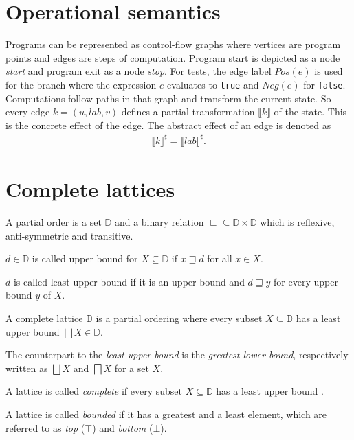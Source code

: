 \section{Operational semantics}
Programs can be represented as control-flow graphs where vertices are program points and edges are steps of computation. Program start is depicted as a node \textit{start} and program exit as a node \textit{stop}.
For tests, the edge label $Pos(e)$ is used for the branch where the expression $e$ evaluates to \verb|true| and $Neg(e)$ for \verb|false|.
Computations follow paths in that graph and transform the current state.
So every edge $k = (u, lab, v)$ defines a partial transformation $\llbracket k \rrbracket$ of the state. This is the concrete effect of the edge.
The abstract effect of an edge is denoted as
\begin{align}
\llbracket k \rrbracket^\sharp = \llbracket lab \rrbracket^\sharp.
\end{align}

\section{Complete lattices}
\begin{definition}A partial order is a set $\mathbb{D}$ and a binary relation $\sqsubseteq \subseteq \mathbb{D} \times \mathbb{D}$ which is reflexive, anti-symmetric and transitive.
\end{definition}
\begin{definition}
$d \in \mathbb{D}$ is called upper bound for $X \subseteq \mathbb{D}$ if $x \sqsupseteq d$ for all $x \in X$.

$d$ is called least upper bound if it is an upper bound and $d \sqsupseteq y$ for every upper bound $y$ of $X$.
\end{definition}
\begin{definition}
A complete lattice $\mathbb{D}$ is a partial ordering where every subset $X \subseteq \mathbb{D}$ has a least upper bound $\bigsqcup X \in \mathbb{D}$.
\end{definition}
The counterpart to the \textit{least upper bound} is the \textit{greatest lower bound}, respectively written as $\bigsqcup X$ and $\bigsqcap X$ for a set $X$.

A lattice is called \textit{complete} if every subset $X \subseteq \mathbb{D}$ has a least upper bound \cite{seidl2009uebersetzerbau}.

A lattice is called \textit{bounded} if it has a greatest and a least element, which are referred to as \textit{top} ($\top$) and \textit{bottom} ($\bot$).

